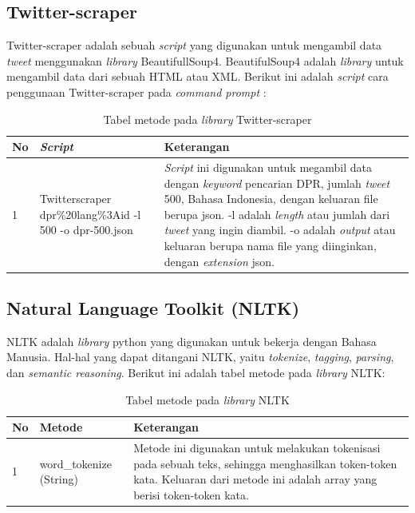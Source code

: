 \subsection{Twitter-scraper}
Twitter-scraper adalah sebuah \textit{script} yang digunakan untuk 
mengambil data \textit{tweet} menggunakan \textit{library }
BeautifullSoup4. BeautifulSoup4 adalah \textit{library }untuk 
mengambil data dari sebuah HTML atau XML. Berikut ini adalah \textit{
	script} cara penggunaan Twitter-scraper pada \textit{command prompt}
:
\begin{table}[H]
	\caption{Tabel metode pada \textit{library} Twitter-scraper}
	\centering
	\small
	\begin{adjustbox}{width=1\textwidth}
	\begin{tabular}{|p{0.5cm}|p{6cm}|p{6cm}|}
		\hline
		\textbf{No} & \textbf{\textit{Script}} & \textbf{Keterangan} \\
		\hline
		1 & Twitterscraper dpr\%20lang\%3Aid -l 500 -o dpr-500.json & \textit{Script }ini digunakan untuk megambil data dengan \textit{keyword }
		pencarian DPR, jumlah \textit{tweet} 500, Bahasa Indonesia, dengan 
		keluaran file berupa json. -l adalah \textit{length} atau jumlah dari 
		\textit{tweet} yang ingin diambil. -o adalah \textit{output} atau 
		keluaran berupa nama file yang diinginkan, dengan \textit{extension} 
		json. \\
		\hline
	\end{tabular}
	\end{adjustbox}
\end{table}
\subsection{Natural Language Toolkit (NLTK)}
NLTK adalah \textit{library} python yang digunakan untuk bekerja 
dengan Bahasa Manusia. Hal-hal yang dapat ditangani NLTK, yaitu \textit{
	tokenize},\textit{ tagging}, \textit{parsing}, dan \textit{
	semantic reasoning}. Berikut ini adalah tabel metode pada \textit{
	library} NLTK:
\begin{table}[H]
	\caption{Tabel metode pada \textit{library} NLTK}
	\centering
	\small
	\begin{adjustbox}{width=1\textwidth}
	\begin{tabular}{|p{0.5cm}|p{6cm}|p{6cm}|}
		\hline
		\textbf{No} & \textbf{Metode} & \textbf{Keterangan} \\
		\hline
		1 & word\_tokenize (String) & Metode ini digunakan untuk melakukan 
		tokenisasi pada sebuah teks, sehingga menghasilkan token-token kata. 
		Keluaran dari metode ini adalah array yang berisi token-token kata. \\
		\hline
	\end{tabular}
	\end{adjustbox}
\end{table}
